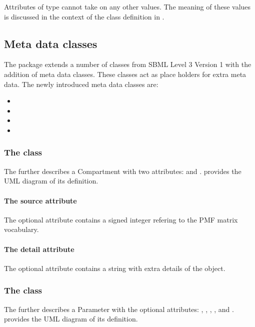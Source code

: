 Attributes of type  cannot take on any other values. The
meaning of these values is discussed in the context of the \RuleMetaData class
definition in .

\subsection{Meta data classes}
The \Pmf package extends a number of classes from SBML Level 3 Version 1 with
the addition of meta data classes. These classes act as place holders for extra
meta data. The newly introduced meta data classes are:
\begin{itemize}
	\item \CompartmentMetaData
	\item \ParameterMetaData
	\item \RuleMetaData
	\item \SpeciesMetaData
\end{itemize}


\subsubsection{The  class}
\label{compartmentmetadata-class}
The \CompartmentMetaData further describes a Compartment with two attributes:
 and .  provides the UML
diagram of its definition.

\paragraph{The source attribute}
The optional attribute  contains a signed integer refering to the
PMF matrix vocabulary.

\paragraph{The detail attribute}
The optional attribute  contains a string with extra details of
the \Compartment object.


\subsubsection{The  class}
\label{parametermetadata-class}
The \ParameterMetaData further describes a Parameter with the optional
attributes: , , , ,
 and .  provides the UML diagram of its
definition.

